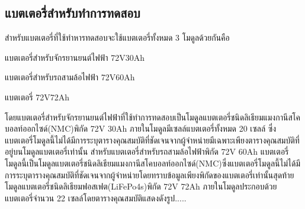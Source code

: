 \subsection{แบตเตอรี่สำหรับทำการทดสอบ}
สำหรับแบตเตอรี่ที่ใช้ทำหารทดสอบจะใช้แบตเตอรี่ทั้งหมด 3 โมดูลด้วยกันคือ
\begin{itemize}
 {\item แบตเตอรี่สำหรับจักรยานยนต์ไฟฟ้า 72V30Ah}
 {\item แบตเตอรี่สำหรับรถสามล้อไฟฟ้า 72V60Ah}
 {\item แบตเตอรี่ 72V72Ah}
\end{itemize}
โดยแบตเตอรี่สำหรับจักรยานยนต์ไฟฟ้าที่ใช้ทำการทดสอบเป็นโมดูลแบตเตอรี่ชนิดลิเธียมแมงกานีสโคบอลท์ออกไซด์(NMC)พิกัด 72V 30Ah ภายในโมดูลมีเซลล์แบตเตอรี่ทั้งหมด 20 เซลล์ ซึ่งแบตเตอรี่โมดูลนี้ไม่ได้มีการระบุตารางคุณสมบัติที่ชัดเจนจากผู้จำหน่ายมีเฉพาะเพียงตารางคุณสมบัติที่อยู่บนโมดูลแบตเตอรี่เท่านั้น สำหรับแบตเตอรี่สำหรับรถสามล้อไฟฟ้าพิกัด 72V 60Ah แบตเตอรี่โมดูลนี้เป็นโมดูลแบตเตอรี่ชนิดลิเธียมแมงกานีสโคบอลท์ออกไซด์(NMC)ซึ่งแบตเตอรี่โมดูลนี้ไม่ได้มีการระบุตารางคุณสมบัติที่ชัดเจนจากผู้จำหน่ายโดยทราบข้อมูลเพียงพิกัดของแบตเตอรี่เท่านั้นสุดท้าย
โมดูลแบตเตอรี่ชนิดลิเธียมฟอสเฟต(LiFePo4s)พิกัด 72V 72Ah ภายในโมดูลประกอบด้วยแบตเตอรี่จำนวน 22 เซลล์โดยตารางคุณสมบัติแสดงดังรูป.....

